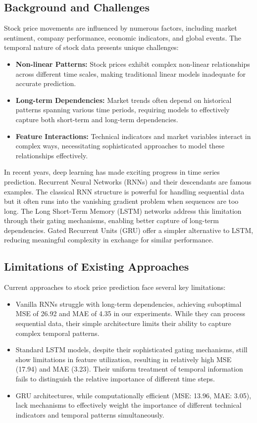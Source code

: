 \documentclass[10pt,twocolumn,letterpaper]{article}
\begin{document}
\subsection{Background and Challenges}
Stock price movements are influenced by numerous factors, including market sentiment, company performance, economic indicators, and global events. The temporal nature of stock data presents unique challenges:
\begin{itemize}
	\item \textbf{Non-linear Patterns:} Stock prices exhibit complex non-linear relationships across different time scales, making traditional linear models inadequate for accurate prediction.
	\item \textbf{Long-term Dependencies:} Market trends often depend on historical patterns spanning various time periods, requiring models to effectively capture both short-term and long-term dependencies.
	\item \textbf{Feature Interactions:} Technical indicators and market variables interact in complex ways, necessitating sophisticated approaches to model these relationships effectively.
\end{itemize}

In recent years, deep learning has made exciting progress in time series prediction. Recurrent Neural Networks (RNNs) and their descendants are famous examples. The classical RNN structure is powerful for handling sequential data but it often runs into the vanishing gradient problem when sequences are too long. The Long Short-Term Memory (LSTM) networks address this limitation through their gating mechanisms, enabling better capture of long-term dependencies. Gated Recurrent Units (GRU) offer a simpler alternative to LSTM, reducing meaningful complexity in exchange for similar performance.

\subsection{Limitations of Existing Approaches}
Current approaches to stock price prediction face several key limitations:
\begin{itemize}
	\item Vanilla RNNs struggle with long-term dependencies, achieving suboptimal MSE of 26.92 and MAE of 4.35 in our experiments. While they can process sequential data, their simple architecture limits their ability to capture complex temporal patterns.
	\item Standard LSTM models, despite their sophisticated gating mechanisms, still show limitations in feature utilization, resulting in relatively high MSE (17.94) and MAE (3.23). Their uniform treatment of temporal information fails to distinguish the relative importance of different time steps.
	\item GRU architectures, while computationally efficient (MSE: 13.96, MAE: 3.05), lack mechanisms to effectively weight the importance of different technical indicators and temporal patterns simultaneously.
\end{itemize}
\end{document}

